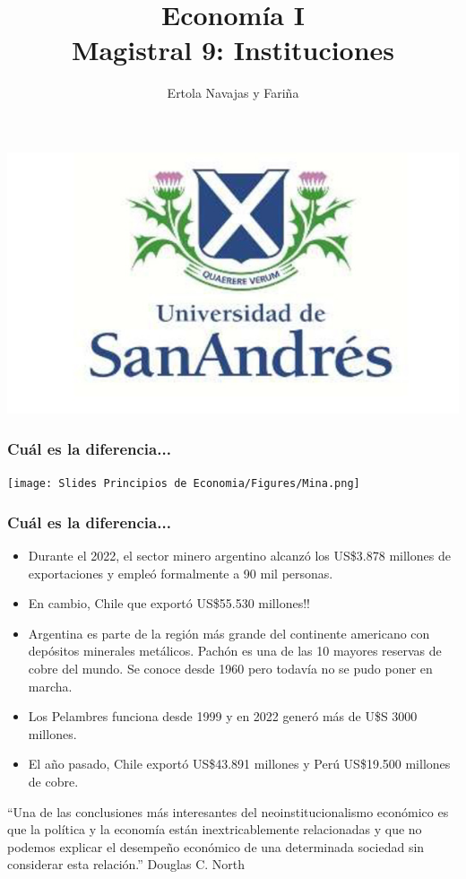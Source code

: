 \documentclass{beamer}
\title[Economía I]{Economía I \vspace{4mm}
\\ Magistral 9: Instituciones}
\date{}
\author[Ertola Navajas y Fariña]{Ertola Navajas y Fariña}
\institute[]{Universidad de San Andrés}
\begin{document}
\begin{frame}
\titlepage
\centering
\includegraphics[scale=0.2]{Slides Principios de Economia/Figures/logoUDESA.jpg} 
\end{frame}


\begin{frame}
\frametitle{Cuál es la diferencia...}
\centering
\texttt{[image: Slides Principios de Economia/Figures/Mina.png]}
\end{frame}

\begin{frame}
\frametitle{Cuál es la diferencia...}
\begin{itemize}
    \item Durante el 2022, el sector minero argentino alcanzó los US\$3.878 millones de exportaciones y empleó formalmente a 90 mil personas.
    \item En cambio, Chile que exportó US\$55.530 millones!!
    \item  Argentina es parte de la región más grande del continente americano con depósitos minerales metálicos. Pachón es una de las 10 mayores reservas de cobre del mundo. Se conoce desde 1960 pero todavía no se pudo poner en marcha.
    \item Los Pelambres funciona desde 1999 y en 2022 generó más de U\$S 3000 millones.
    \item  El año pasado, Chile exportó US\$43.891 millones y Perú US\$19.500 millones de cobre. 
\end{itemize}
\end{frame}



\begin{frame}
\centering
“Una de las conclusiones más interesantes del neoinstitucionalismo económico es que la política y la economía están inextricablemente relacionadas y que no podemos explicar el desempeño económico de una determinada sociedad sin considerar esta relación.” Douglas C. North
\end{frame}
\end{document}
